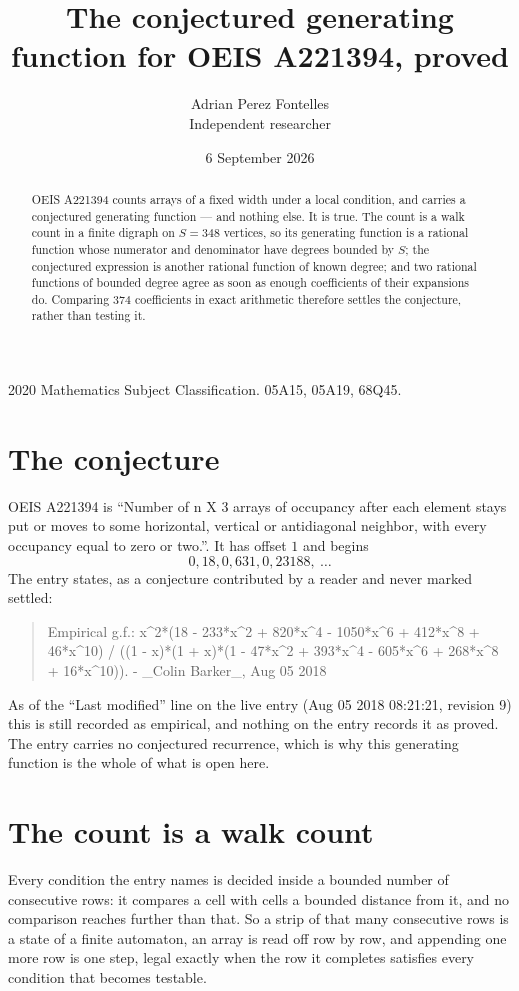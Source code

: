 \documentclass[11pt,a4paper]{article}
\title{The conjectured generating function for OEIS A221394, proved}
\author{Adrian Perez Fontelles\\ \small Independent researcher}
\date{6 September 2026}
\theoremstyle{plain}
\theoremstyle{definition}
\begin{document}
\maketitle

\begin{abstract}
OEIS A221394 counts arrays of a fixed width under a local condition, and carries a conjectured
generating function --- and nothing else. It is true. The count is a walk count in a finite
digraph on $S=348$ vertices, so its generating function is a rational function whose numerator
and denominator have degrees bounded by $S$; the conjectured expression is another rational
function of known degree; and two rational functions of bounded degree agree as soon as enough
coefficients of their expansions do. Comparing $374$ coefficients in exact arithmetic
therefore settles the conjecture, rather than testing it.
\end{abstract}

\noindent\small 2020 Mathematics Subject Classification. 05A15, 05A19, 68Q45.\normalsize

\section{The conjecture}

OEIS A221394 is ``Number of n X 3 arrays of occupancy after each element stays put or moves to some horizontal, vertical or antidiagonal neighbor, with every occupancy equal to zero or two.''. It has offset $1$ and begins
\[
0, 18, 0, 631, 0, 23188,\ \dots
\]
The entry states, as a conjecture contributed by a reader and never marked settled:
\begin{quote}
Empirical g.f.: x\^{}2*(18 - 233*x\^{}2 + 820*x\^{}4 - 1050*x\^{}6 + 412*x\^{}8 + 46*x\^{}10) / ((1 - x)*(1 + x)*(1 - 47*x\^{}2 + 393*x\^{}4 - 605*x\^{}6 + 268*x\^{}8 + 16*x\^{}10)). - \_Colin Barker\_, Aug 05 2018
\end{quote}
As of the ``Last modified'' line on the live entry (Aug 05 2018 08:21:21, revision 9) this is still
recorded as empirical, and nothing on the entry records it as proved. The entry carries no
conjectured recurrence, which is why this generating function is the whole of what is open
here.

\section{The count is a walk count}

Every condition the entry names is decided inside a bounded number of consecutive rows: it
compares a cell with cells a bounded distance from it, and no comparison reaches further than
that. So a strip of that many consecutive rows is a state of a finite automaton, an array is
read off row by row, and appending one more row is one step, legal exactly when the row it
completes satisfies every condition that becomes testable.
\end{document}
